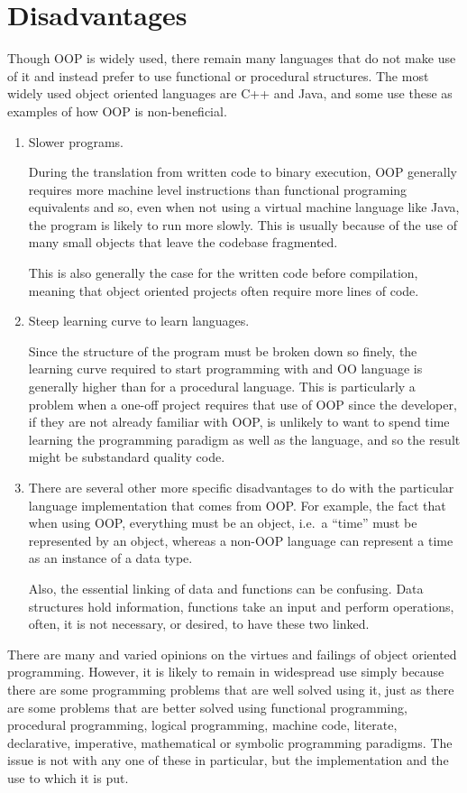 \documentclass[11pt]{article} %
\begin{document}
\section{Disadvantages}
Though OOP is widely used, there remain many languages that do not make use of
it and instead prefer to use functional or procedural structures. The most
widely used object oriented languages are C++ and Java, and some use these as
examples of how OOP is non-beneficial\cite{arc}.

\begin{enumerate}
	\item Slower programs\cite{Cardelli:1996:BEP:242224.242415}.

		During the translation from written code to binary execution, OOP
		generally requires more machine level instructions than functional
		programing equivalents and so, even when not using a virtual machine
		language like Java, the program is likely to run more slowly. This is
		usually because of the use of many small objects that leave the
		codebase fragmented.

		This is also generally the case for the written code before
		compilation, meaning that object oriented projects often require more
		lines of code.

	\item Steep learning curve to learn languages.

		Since the structure of the program must be broken down so finely, the
		learning curve required to start programming with and OO language is
		generally higher than for a procedural language. This is particularly a
		problem when a one-off project requires that use of OOP since the
		developer, if they are not already familiar with OOP, is unlikely to
		want to spend time learning the programming paradigm as well as the
		language, and so the result might be substandard quality code.

	\item There are several other more specific disadvantages to do with the
		particular language implementation that comes from OOP\@. For example,
		the fact that when using OOP, everything must be an object, i.e.\ a
		``time'' must be represented by an object, whereas a non-OOP language
		can represent a time as an instance of a data type.

		Also, the essential linking of data and functions can be confusing.
		Data structures hold information, functions take an input and perform
		operations, often, it is not necessary, or desired, to have these two
		linked.
\end{enumerate}

There are many and varied opinions on the virtues and failings of object
oriented programming. However, it is likely to remain in widespread use simply
because there are some programming problems that are well solved using it, just
as there are some problems that are better solved using functional programming,
procedural programming, logical programming, machine code, literate,
declarative, imperative, mathematical or symbolic programming paradigms. The
issue is not with any one of these in particular, but the implementation and
the use to which it is put.



\end{document}
